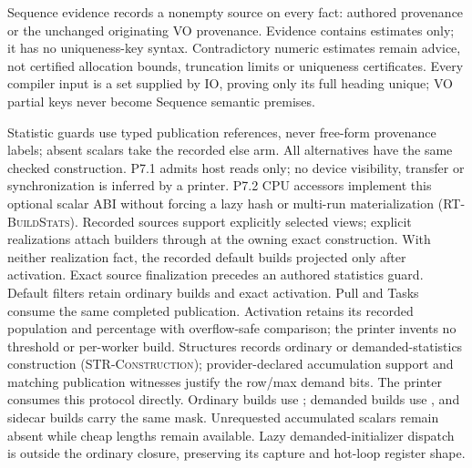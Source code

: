 Sequence evidence records a nonempty source on every fact: authored provenance
or the unchanged originating VO provenance. Evidence contains estimates only;
it has no uniqueness-key syntax. Contradictory numeric estimates remain advice,
not certified allocation bounds, truncation limits or uniqueness certificates.
Every compiler input is a set supplied by IO, proving only its full heading
unique; VO partial keys never become Sequence semantic premises.
\begin{mathpar}
\end{mathpar}
Statistic guards use typed publication references, never free-form provenance
labels; absent scalars take the recorded else arm. All alternatives have the
same checked construction. P7.1 admits host reads only; no device visibility,
transfer or synchronization is inferred by a printer.
P7.2 CPU accessors implement this optional scalar ABI without forcing a lazy
hash or multi-run materialization (\textsc{RT-BuildStats}). Recorded
 sources support explicitly selected 
views; explicit  realizations attach 
builders through  at the owning exact construction.
With neither realization fact, the recorded default builds projected
 only after activation. Exact source finalization
precedes an authored statistics guard. Default filters retain ordinary builds
and exact  activation. Pull and Tasks consume the same completed
publication. Activation retains its recorded population and percentage with
overflow-safe comparison; the printer invents no threshold or per-worker build.
Structures records ordinary or demanded-statistics construction
(\textsc{STR-Construction}); provider-declared accumulation support and
matching publication witnesses justify the row/max demand bits.
The printer consumes this protocol directly. Ordinary builds use ;
demanded builds use , and sidecar builds carry the
same mask. Unrequested accumulated scalars remain absent while cheap lengths
remain available. Lazy demanded-initializer dispatch is outside the ordinary
 closure, preserving its capture and hot-loop register shape.

